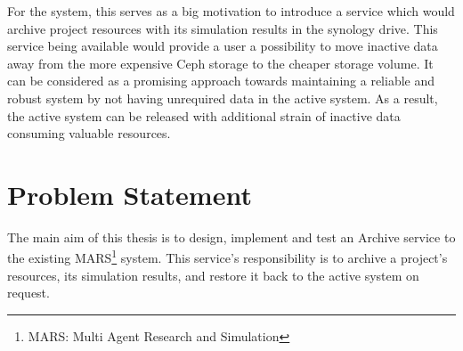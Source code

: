             \par

            For the system, this serves as a big
            motivation to introduce a service which would archive  project resources with its
            simulation results in the synology drive. This service being available would provide a user a possibility
            to move inactive data away from the more expensive Ceph storage to the cheaper storage volume.
            It can be considered as a promising approach towards maintaining a reliable and robust system by not having unrequired data in the 
            active system. As a result, the active system can be released with additional strain of inactive data consuming valuable resources.

 

    \newpage        
    \section{Problem Statement}

        The main aim of this thesis is to design, implement and test an Archive service
        to the existing MARS\footnote{MARS: Multi Agent Research and Simulation} system. This service's responsibility is to archive a project's resources,
        its simulation results, and restore it back to the active system on request. 
        
